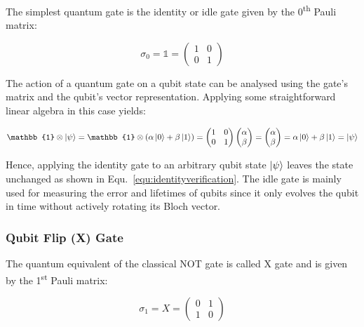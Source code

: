 The simplest quantum gate is the identity or idle gate given by the 0\textsuperscript{th} Pauli matrix:

\begin{equation}
\sigma_{0} = \mathbb{1} = \begin{pmatrix}
 1 & 0 \\ 
 0 & 1
 \end{pmatrix}
\end{equation}

The action of a quantum gate on a qubit state can be analysed using the gate's matrix and the qubit's vector representation. Applying some straightforward linear algebra in this case yields:

\begin{equation}
\label{equ:identityverification}
\mathbb{1} \otimes \ket{\psi} = \mathbb{1} \otimes (\alpha \ket{0} + \beta \ket{1}) = \begin{pmatrix}
 1 & 0 \\ 
 0 & 1
 \end{pmatrix} \begin{pmatrix}
 \alpha  \\ 
 \beta
 \end{pmatrix} = \begin{pmatrix}
 \alpha  \\ 
 \beta
 \end{pmatrix} = \alpha \ket{0} + \beta \ket{1} = \ket{\psi}
\end{equation}

Hence, applying the identity gate to an arbitrary qubit state $\ket{\psi}$ leaves the state unchanged as shown in Equ.~\ref{equ:identityverification}. The idle gate is mainly used for measuring the error and lifetimes of qubits since it only evolves the qubit in time without actively rotating its Bloch vector.

\subsubsection{Qubit Flip (X) Gate}
\label{subsubsubsec:xgate}

The quantum equivalent of the classical NOT gate is called X gate and is given by the 1\textsuperscript{st} Pauli matrix:

\begin{equation}
\sigma_{1} = X = \begin{pmatrix}
 0 & 1 \\ 
 1 & 0
 \end{pmatrix}
\end{equation}

